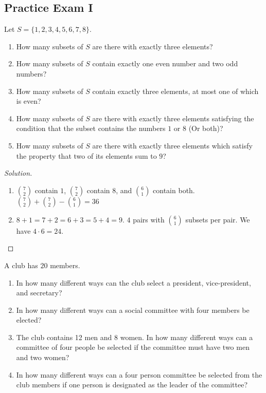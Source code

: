 \documentclass[crop=false,class=book,oneside]{standalone}
\begin{document}
\subsection{Practice Exam I}
\begin{problem}
Let $S = \{1,2,3,4,5,6,7,8\}$.
\begin{enumerate}
    \item How many subsets of $S$ are there with exactly three elements?
    \item How many subsets of $S$ contain exactly one even number and two odd numbers?
    \item How many subsets of $S$ contain exactly three elements, at most one of which is even?
    \item How many subsets of $S$ are there with exactly three elements satisfying the condition that the subset contains the numbers $1$ or $8$ (Or both)?
    \item How many subsets of $S$ are there with exactly three elements which satisfy the property that two of its elements sum to $9$?
\end{enumerate}
\end{problem}
\begin{proof}[Solution]
\
\begin{enumerate}
\begin{multicols}{3}
    \item $\binom{8}{3} = \frac{8!}{3!(8-3)!} = 56$
    \item $\binom{4}{1}\binom{4}{2} = 24$
    \item $\binom{4}{1} \binom{4}{2} + \binom{4}{0} \binom{4}{3} = 28$.
\end{multicols}
    \item $\binom{7}{2}$ contain $1$, $\binom{7}{2}$ contain $8$, and $\binom{6}{1}$ contain both. $\binom{7}{2}+\binom{7}{2}-\binom{6}{1}=36$
    \item $8+1=7+2=6+3=5+4=9$. $4$ pairs with $\binom{6}{1}$ subsets per pair. We have $4\cdot 6 = 24$.
\end{enumerate}
\end{proof}
\begin{problem}
A club has $20$ members.
\begin{enumerate}
    \item In how many different ways can the club select a president, vice-president, and secretary?
    \item In how many different ways can a social committee with four members be elected?
    \item The club contains 12 men and 8 women. In how many different ways can a committee of four people be selected if the committee must have two men and two women?
    \item In how many different ways can a four person committee be selected from the club members if one person is designated as the leader of the committee?
\end{enumerate}
\end{problem}
\end{document}

